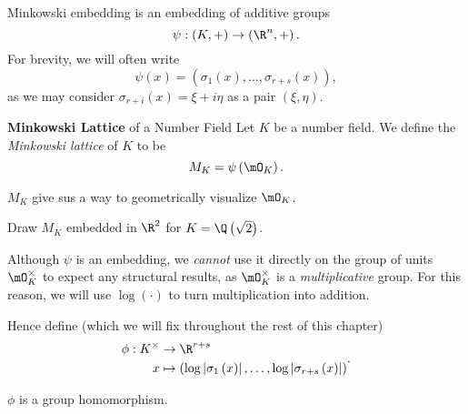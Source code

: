 \documentclass[pmath441]{subfiles}
\begin{document}
    \np Minkowski embedding is an embedding of additive groups
    \begin{equation*}
        \psi:\left( K,+ \right) \to \left( \R^n,+ \right).
    \end{equation*}
    For brevity, we will often write
    \begin{equation*}
        \psi\left( x \right) = \left( \sigma_1\left( x \right),\ldots,\sigma_{r+s}\left( x \right) \right),
    \end{equation*}
    as we may consider $\sigma_{r+i}\left( x \right) = \xi+i\eta$ as a pair $\left( \xi,\eta \right)$.

    \begin{definition}{\textbf{Minkowski Lattice} of a Number Field}
        Let $K$ be a number field. We define the \emph{Minkowski lattice} of $K$ to be
        \begin{equation*}
            M_K = \psi\left( \mO_K \right).
        \end{equation*}
    \end{definition}

    \np $M_K$ give sus a way to geometrically visualize $\mO_K$.

    \begin{exercise}{}
        Draw $M_K$ embedded in $\R^{2}$ for $K=\Q\left( \sqrt{2} \right)$.
    \end{exercise}

    \rruleline

    \np Although $\psi$ is an embedding, we \textit{cannot} use it directly on the group of units $\mO_K^\times$ to expect any structural results, as $\mO_K^\times$ is a \textit{multiplicative} group. For this reason, we will use $\log\left( \cdot \right)$ to turn multiplication into addition.

    Hence define (which we will fix throughout the rest of this chapter)
    \begin{equation*}
        \begin{aligned}
            \phi:K^\times&\to\R^{r+s} \\
            x & \mapsto \left( \log\left| \sigma_1\left( x \right) \right|,\ldots,\log\left| \sigma_{r+s}\left( x \right) \right| \right)
        \end{aligned} .
    \end{equation*}

    \begin{prop}{}
        $\phi$ is a group homomorphism.
    \end{prop}
\end{document}
